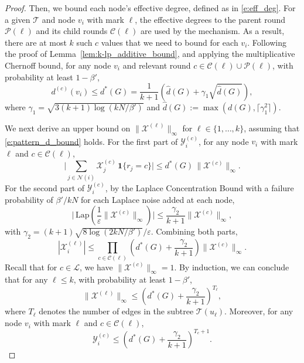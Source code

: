 \begin{proof}
Then, we bound each node's effective degree, defined as in \eqref{e:eff_deg}.
For a given $\mathcal{T}$ and node $v_i$ with mark $\ell$, the effective degrees to the parent round $\mathcal{P}(\ell)$ and its child rounds $\mathcal{C}(\ell)$ are used by the mechanism.
As a result, there are at most $k$ such $c$ values that we need to bound for each $v_i$.
Following the proof of Lemma~\ref{lem:k-lp_additive_bound}, and applying the multiplicative Chernoff bound, for any node $v_i$ and relevant round $c \in \mathcal{C}(\ell) \cup \mathcal{P}(\ell)$, with probability at least $1 - \beta'$,
\begin{equation}
\label{e:pattern_d_bound}
    d^{(c)}(v_i) \leq d^*(G) = \frac{1}{k+1} \left( \hat{d}(G) + \gamma_1 \sqrt{\hat{d}(G)} \right),
\end{equation}
where $\gamma_1 = \sqrt{3(k{+}1)\log(kN/\beta')}$ and $\hat{d}(G) := \max(d(G), \lceil \gamma_1^2 \rceil)$.



We next derive an upper bound on $\|\mathcal{X}^{(\ell)}\|_\infty$ for $\ell \in \{1, \dots, k\}$, assuming that \eqref{e:pattern_d_bound} holds. 
For the first part of $\mathcal{Y}_i^{(c)}$, for any node $v_i$ with mark $\ell$ and $c \in \mathcal{C}(\ell)$,
\begin{equation*}
   \bigg| \sum_{j \in \mathcal{N}(i)} 
           {\mathcal{X}}_j^{(c)} \,
           \mathbf{1}\{r_j = c\} \bigg|
        \leq 
        d^*(G) \, \|\mathcal{X}^{(c)}\|_\infty.
\end{equation*}
For the second part of $\mathcal{Y}_i^{(c)}$, by the Laplace Concentration Bound with a failure probability of $\beta'/kN$ for each Laplace noise added at each node,
\begin{equation*}
    \bigg|\, \mathrm{Lap}(\frac{1}{\varepsilon}\|\mathcal{X}^{(c)}\|_\infty) \bigg|
    \leq \frac{\gamma_2}{k+1} \|\mathcal{X}^{(c)}\|_\infty,
\end{equation*}
with $\gamma_2 = (k+1)\sqrt{8\log(2kN/\beta')}/\varepsilon$. 
Combining both parts,
\begin{equation*}
     |\mathcal{X}^{(\ell)}_i|  
     \leq 
     \prod_{c \in \mathcal{C}(\ell)} 
     (d^*(G) + \frac{\gamma_2}{k+1}) \|\mathcal{X}^{(c)}\|_\infty.
\end{equation*}
Recall that for $c \in \mathcal{L}$, we have $\|\mathcal{X}^{(c)}\|_\infty = 1$. 
By induction, we can conclude that for any $\ell \leq k$, with probability at least $1 - \beta'$,
\begin{equation}
\label{e:pattern_round_max}
   \|\mathcal{X}^{(\ell)}\|_\infty 
   \leq 
   (d^*(G) + \frac{\gamma_2}{k+1})^{T_\ell},
\end{equation} 
where $T_\ell$ denotes the number of edges in the subtree $\mathcal{T}(u_\ell)$. 
Moreover, for any node $v_i$ with mark $\ell$ and $c \in \mathcal{C}(\ell)$,
\begin{equation}
\label{e:y_max}
 \mathcal{Y}^{(c)}_i \leq (d^*(G) + \frac{\gamma_2}{k+1})^{T_c + 1}.
\end{equation}



\end{proof}
